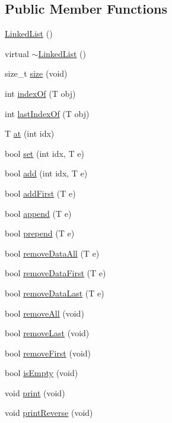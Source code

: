 \subsection*{Public Member Functions}
\begin{DoxyCompactItemize}
\item 
\hyperlink{class_linked_list_a3c20fcfec867e867f541061a09fc640c}{Linked\+List} ()
\item 
virtual \hyperlink{class_linked_list_a7c37609df3b83bc4eb0281b852f93fd7}{$\sim$\+Linked\+List} ()
\item 
size\+\_\+t \hyperlink{class_linked_list_adce22d095b20331199fa9dcf4ff471e8}{size} (void)
\item 
int \hyperlink{class_linked_list_ac7528b9fb86613555688bf8b7507b864}{index\+Of} (T obj)
\item 
int \hyperlink{class_linked_list_a841df1d800b6bb00514d3c3dacb67a06}{last\+Index\+Of} (T obj)
\item 
T \hyperlink{class_linked_list_aec89a8d5662a05d09cc2a21614e0a5c3}{at} (int idx)
\item 
bool \hyperlink{class_linked_list_a3b4d7ca9e8efe65b20a08a6625269060}{set} (int idx, T e)
\item 
bool \hyperlink{class_linked_list_ac206c5bcc017153cd9d9eae682209d72}{add} (int idx, T e)
\item 
bool \hyperlink{class_linked_list_a68a36a4d9732b70fcae967e3f4fd10c6}{add\+First} (T e)
\item 
bool \hyperlink{class_linked_list_a01ebe5f91a7eecd0695ca437dda4df51}{append} (T e)
\item 
bool \hyperlink{class_linked_list_ae56acf1ac7a863fff96ec27cd37662b9}{prepend} (T e)
\item 
bool \hyperlink{class_linked_list_a59d52f0573972f2e806014dd95245f9f}{remove\+Data\+All} (T e)
\item 
bool \hyperlink{class_linked_list_a7f58d8e5bf210db0d9e3f8f71c6ce990}{remove\+Data\+First} (T e)
\item 
bool \hyperlink{class_linked_list_a73453714583a25d75076c774f98c0b6e}{remove\+Data\+Last} (T e)
\item 
bool \hyperlink{class_linked_list_ae3231ec92da15fef89494fb709a4ac40}{remove\+All} (void)
\item 
bool \hyperlink{class_linked_list_a729c1b4800c3073d4089710ec24027bb}{remove\+Last} (void)
\item 
bool \hyperlink{class_linked_list_a8bdaa628cff86869bb165133d11f5fbd}{remove\+First} (void)
\item 
bool \hyperlink{class_linked_list_a37253576d2801044aa93306c28b85dff}{is\+Empty} (void)
\item 
void \hyperlink{class_linked_list_ad2b912b439ed980d9758b56016e74b40}{print} (void)
\item 
void \hyperlink{class_linked_list_a3a34150ae8af3f78f1d18c828d5cb2f5}{print\+Reverse} (void)
\end{DoxyCompactItemize}
